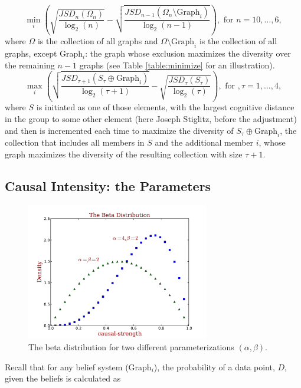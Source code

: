 \documentclass[11pt]{article}
\begin{document}
\begin{equation}\label{eq:min}
\min_i\left(\sqrt{\frac{JSD_n(\Omega_n)}{\log_2(n)}}-\sqrt{\frac{JSD_{n-1}(\Omega_n\setminus\text{Graph}_i)}{\log_2(n-1)}}\right), \text{ for } n=10, \ldots, 6,
\end{equation}
where $\Omega$ is the collection of all graphs and $\Omega\setminus\text{Graph}_i$ is the collection of all graphs, except Graph$_i$: the graph whose exclusion maximizes the diversity over the remaining $n-1$ graphs (see Table \ref{table:minimize} for an illustration).
\begin{equation}\label{eq:max}
\max_i\left(\sqrt{\frac{JSD_{\tau+1}(S_{\tau}\oplus\text{Graph}_i)}{\log_2(\tau+1)}}-\sqrt{\frac{JSD_{\tau}(S_{\tau})}{\log_2(\tau)}}\right), \text{ for }, \tau=1, \ldots, 4,
\end{equation}
where $S$ is initiated as one of those elements, with the largest cognitive distance in the group to some other element (here Joseph Stiglitz, before the adjustment) and then is incremented each time to maximize the diversity of $S_{\tau}\oplus\text{Graph}_i$, the collection that includes all members in $S$ and the additional member $i$, whose graph maximizes the diversity of the resulting collection with size $\tau + 1$.
\subsection{Causal Intensity: the Parameters}
\label{sec-4-5}


\begin{figure}
        \centering
        \includegraphics[width=80mm]{beta.pdf}
  \caption{The beta distribution for two different parameterizations $(\alpha, \beta)$.}
                \label{fig:beta}
        \end{figure}%

Recall that for any belief system (Graph$_i$), the probability of a data point, $D$, given the beliefs is calculated as
\end{document}
